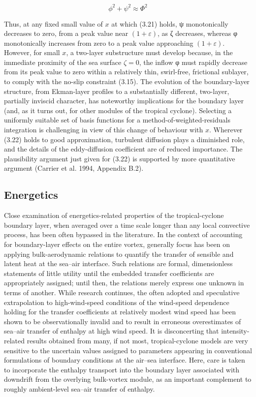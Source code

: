 \documentclass[preprint, prX]{revtex4}
\begin{document}
\begin{equation}
\phi^2 + \psi^2 \approx \Phi^2
\end{equation}

Thus, at any fixed small value of $x$ at which (3.21) holds, ψ monotonically decreases to zero, from a peak value near $(1 + \varepsilon)$, as ζ decreases, whereas φ monotonically increases from zero to a peak value approaching $(1 + \varepsilon)$. However, for small $x$, a two-layer substructure must develop because, in the immediate proximity of the sea surface $\zeta = 0$, the inflow φ must rapidly decrease from its peak value to zero within a relatively thin, swirl-free, frictional sublayer, to comply with the no-slip constraint (3.15). The evolution of the boundary-layer structure, from Ekman-layer profiles to a substantially different, two-layer, partially inviscid character, has noteworthy implications for the boundary layer (and, as it turns out, for other modules of the tropical cyclone). Selecting a uniformly suitable set of basis functions for a method-of-weighted-residuals integration is challenging in view of this change of behaviour with $x$. Wherever (3.22) holds to good approximation, turbulent diffusion plays a diminished role, and the details of the eddy-diffusion coefficient are of reduced importance. The plausibility argument just given for (3.22) is supported by more quantitative argument (Carrier et al. 1994, Appendix B.2).

\subsection{Energetics}

Close examination of energetics-related properties of the tropical-cyclone boundary layer, when averaged over a time scale longer than any local convective process, has been often bypassed in the literature. In the context of accounting for boundary-layer effects on the entire vortex, generally focus has been on applying bulk-aerodynamic relations to quantify the transfer of sensible and latent heat at the sea–air interface. Such relations are formal, dimensionless statements of little utility until the embedded transfer coefficients are appropriately assigned; until then, the relations merely express one unknown in terms of another. While research continues, the often adopted and speculative extrapolation to high-wind-speed conditions of the wind-speed dependence holding for the transfer coefficients at relatively modest wind speed has been shown to be observationally invalid and to result in erroneous overestimates of sea–air transfer of enthalpy at high wind speed. It is disconcerting that intensity-related results obtained from many, if not most, tropical-cyclone models are very sensitive to the uncertain values assigned to parameters appearing in conventional formulations of boundary conditions at the air–sea interface. Here, care is taken to incorporate the enthalpy transport into the boundary layer associated with downdrift from the overlying bulk-vortex module, as an important complement to roughly ambient-level sea–air transfer of enthalpy.
\end{document}
